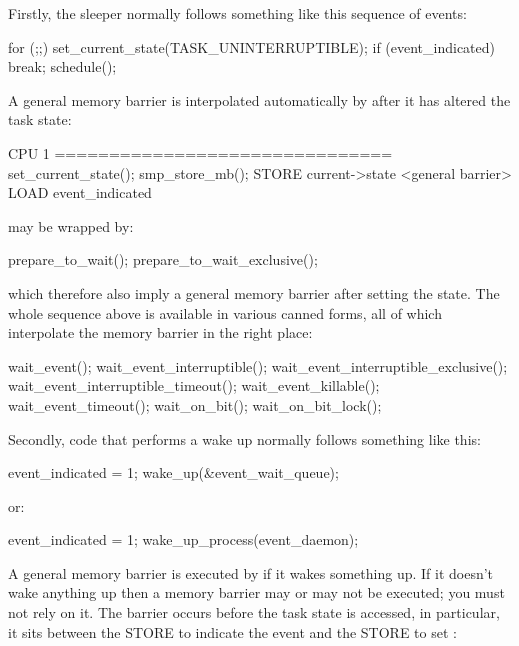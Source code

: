 Firstly, the sleeper normally follows something like this sequence of events:

\begin{VerbatimU}
	for (;;) {
		set_current_state(TASK_UNINTERRUPTIBLE);
		if (event_indicated)
			break;
		schedule();
	}
\end{VerbatimU}

A general memory barrier is interpolated automatically by
 after it has altered the task state:

\begin{VerbatimU}
	CPU 1
	===============================
	set_current_state();
	  smp_store_mb();
	    STORE current->state
	    <general barrier>
	LOAD event_indicated
\end{VerbatimU}

 may be wrapped by:

\begin{VerbatimU}
	prepare_to_wait();
	prepare_to_wait_exclusive();
\end{VerbatimU}

which therefore also imply a general memory barrier after setting the state.
The whole sequence above is available in various canned forms, all of which
interpolate the memory barrier in the right place:

\begin{VerbatimU}
	wait_event();
	wait_event_interruptible();
	wait_event_interruptible_exclusive();
	wait_event_interruptible_timeout();
	wait_event_killable();
	wait_event_timeout();
	wait_on_bit();
	wait_on_bit_lock();
\end{VerbatimU}

Secondly, code that performs a wake up normally follows something like this:

\begin{VerbatimU}
	event_indicated = 1;
	wake_up(&event_wait_queue);
\end{VerbatimU}

or:

\begin{VerbatimU}
	event_indicated = 1;
	wake_up_process(event_daemon);
\end{VerbatimU}

A general memory barrier is executed by  if it wakes something up.
If it doesn't wake anything up then a memory barrier may or may not be
executed; you must not rely on it.
The barrier occurs before the task state is accessed, in particular, it sits
between the STORE to indicate the event and the STORE to set :

